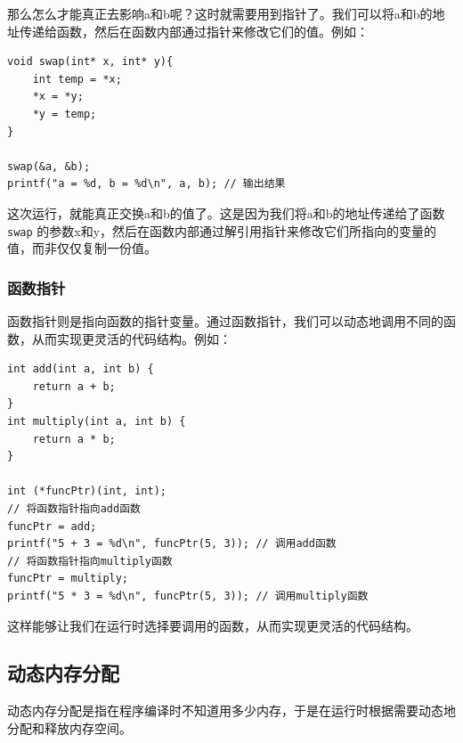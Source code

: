 那么怎么才能真正去影响a和b呢？这时就需要用到指针了。我们可以将a和b的地址传递给函数，然后在函数内部通过指针来修改它们的值。例如：
\begin{verbatim}
void swap(int* x, int* y){
    int temp = *x;
    *x = *y;
    *y = temp;
}

swap(&a, &b);
printf("a = %d, b = %d\n", a, b); // 输出结果
\end{verbatim}
这次运行，就能真正交换a和b的值了。这是因为我们将a和b的地址传递给了函数 \texttt{swap} 的参数x和y，然后在函数内部通过解引用指针来修改它们所指向的变量的值，而非仅仅复制一份值。

\subsubsection{函数指针}

函数指针则是指向函数的指针变量。通过函数指针，我们可以动态地调用不同的函数，从而实现更灵活的代码结构。例如：
\begin{verbatim}
int add(int a, int b) {
    return a + b;
}
int multiply(int a, int b) {
    return a * b;
}

int (*funcPtr)(int, int);
// 将函数指针指向add函数
funcPtr = add;
printf("5 + 3 = %d\n", funcPtr(5, 3)); // 调用add函数
// 将函数指针指向multiply函数
funcPtr = multiply;
printf("5 * 3 = %d\n", funcPtr(5, 3)); // 调用multiply函数
\end{verbatim}

这样能够让我们在运行时选择要调用的函数，从而实现更灵活的代码结构。

\subsection{动态内存分配}

动态内存分配是指在程序编译时不知道用多少内存，于是在运行时根据需要动态地分配和释放内存空间。

